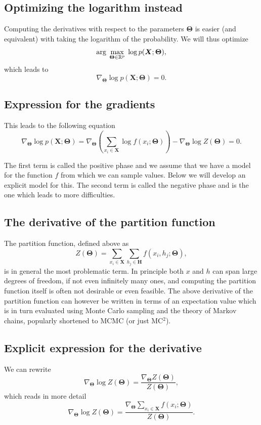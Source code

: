 \documentclass[%
oneside,                 %
final,                   %
10pt]{article}
\begin{document}
\subsection{Optimizing the logarithm instead}

Computing the derivatives with respect to the parameters $\bm{\Theta}$ is
easier (and equivalent) with taking the logarithm of the
probability. We will thus optimize
\[
{\displaystyle \mathrm{arg} \hspace{0.1cm}\max_{\bm{\bm{\Theta}}\in {\mathbb{R}}^{p}}} \hspace{0.1cm}\log{p(\bm{X};\bm{\Theta})},
\]
which leads to
\[
\nabla_{\bm{\Theta}}\log{p(\bm{X};\bm{\Theta})}=0.
\]

\subsection{Expression for the gradients}

This leads to the following equation
\[
\nabla_{\bm{\Theta}}\log{p(\bm{X};\bm{\Theta})}=\nabla_{\bm{\Theta}}\left(\sum_{x_i\in \bm{X}}\log{f(x_i;\bm{\Theta})}\right)-\nabla_{\bm{\Theta}}\log{Z(\bm{\Theta})}=0.
\]

The first term is called the positive phase and we assume that we have a model for the function $f$ from which we can sample values. Below we will develop an explicit model for this.
The second term is called the negative phase and is the one which leads to more difficulties.

\subsection{The derivative of the partition function}

The partition function, defined above as
\[
Z(\bm{\Theta})=\sum_{x_i\in \bm{X}}\sum_{h_j\in \bm{H}} f(x_i,h_j;\bm{\Theta}),
\]
is in general the most problematic term. In principle both $x$ and $h$ can span large degrees of freedom, if not even infinitely many ones, and computing the partition function itself is often not desirable or even feasible. The above derivative of the partition function can however be written in terms of an expectation value which is in turn evaluated  using Monte Carlo sampling and the theory of Markov chains, popularly shortened to MCMC (or just MC$^2$).

\subsection{Explicit expression for the derivative}
We can rewrite
\[
\nabla_{\bm{\Theta}}\log{Z(\bm{\Theta})}=\frac{\nabla_{\bm{\Theta}}Z(\bm{\Theta})}{Z(\bm{\Theta})},
\]
which reads in more detail
\[
\nabla_{\bm{\Theta}}\log{Z(\bm{\Theta})}=\frac{\nabla_{\bm{\Theta}} \sum_{x_i\in \bm{X}}f(x_i;\bm{\Theta})   }{Z(\bm{\Theta})}.
\]
\end{document}
